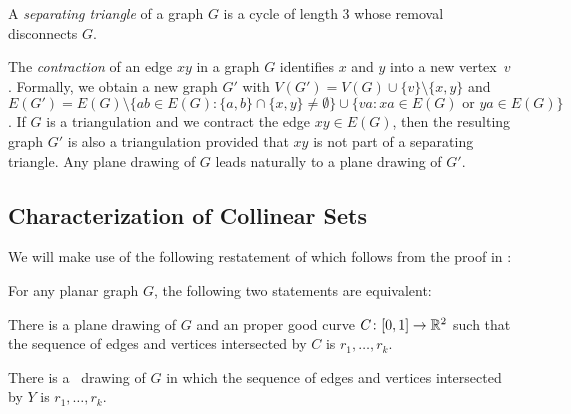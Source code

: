 A \emph{separating triangle} of a graph $G$ is
a cycle of length 3
 whose removal disconnects $G$.

The \emph{contraction} of an edge $xy$ in a graph $G$ identifies $x$
and $y$
into a new vertex~$v$.
Formally, we obtain a new graph $G'$ with
$V(G')=V(G)\cup\{v\}\setminus\{x,y\}$ and $E(G')=E(G)\setminus\{ab\in
E(G): \{a,b\}\cap\{x,y\}\neq\emptyset\}\cup\{va: xa\in E(G)\text{ or }
ya\in E(G)\}$.  
If $G$ is a triangulation and we
contract the edge $xy\in E(G)$, then the resulting graph $G'$ is also
a triangulation provided that $xy$ is not part of a separating
triangle. %
Any plane drawing of $G$ leads naturally
to a plane drawing of $G'$.

\subsection{Characterization of Collinear Sets}





We will make use of the following restatement of 
which follows from the proof in \cite{dalozzo.dujmovic.ea:drawing}:
\begin{thm}
	For any planar graph $G$, the following two statements are equivalent:
	\begin{compactenum}
   \item There is a plane drawing %
          of $G$ and an
		proper good curve $C\colon [0,1]\to\mathbb{R}^2$ such that the sequence of edges
and vertices intersected by $C$ is $r_1,\ldots,r_k$.
\item There is a \Fary\ drawing %
  of $G$ in which the sequence of edges and vertices intersected by
  $Y$ is $r_1,\ldots,r_k$.
	\end{compactenum}
\end{thm}


